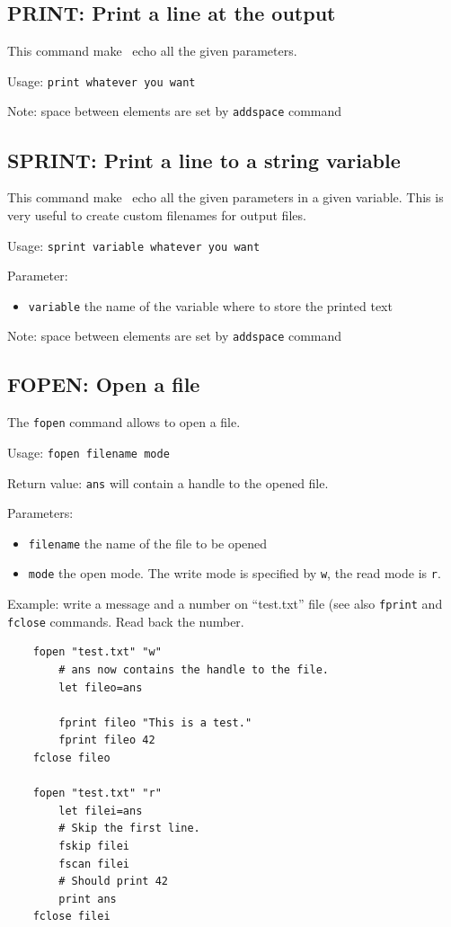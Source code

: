 \subsection{PRINT: Print a line at the output}
    This command make \afmm\ echo all the given parameters.
    
    Usage: \lstinline!print whatever you want!

	Note: space between elements are set by \lstinline!addspace! command
\subsection{SPRINT: Print a line to a string variable}
    This command make \afmm\ echo all the given parameters in a given variable. 
    This is very useful to create custom filenames for output files.
    
    Usage: \lstinline!sprint variable whatever you want!
    
    Parameter:
    \begin{itemize}
    \item\lstinline!variable! the name of the variable where to store the 
    printed text
    \end{itemize}
            
    Note: space between elements are set by \lstinline!addspace! command
     
\subsection{FOPEN: Open a file}
    The \lstinline!fopen! command allows to open a file.

    Usage: \lstinline!fopen filename mode!
    
    Return value: \lstinline!ans! will contain a handle to the opened file.
    
    Parameters:
    \begin{itemize}
    \item\lstinline!filename! the name of the file to be opened
    \item\lstinline!mode! the open mode. The write mode is 
            specified by \lstinline!w!, the read mode is \lstinline!r!.
    \end{itemize}
    
    Example: write a message and a number on ``test.txt'' file (see also \lstinline!fprint! and \lstinline!fclose! commands. Read back the number.
        
    \begin{lstlisting}
    fopen "test.txt" "w"
        # ans now contains the handle to the file.
        let fileo=ans
            
        fprint fileo "This is a test."
        fprint fileo 42
    fclose fileo
    
    fopen "test.txt" "r"
        let filei=ans
        # Skip the first line.
        fskip filei
        fscan filei
        # Should print 42
        print ans
    fclose filei
    \end{lstlisting}
    
